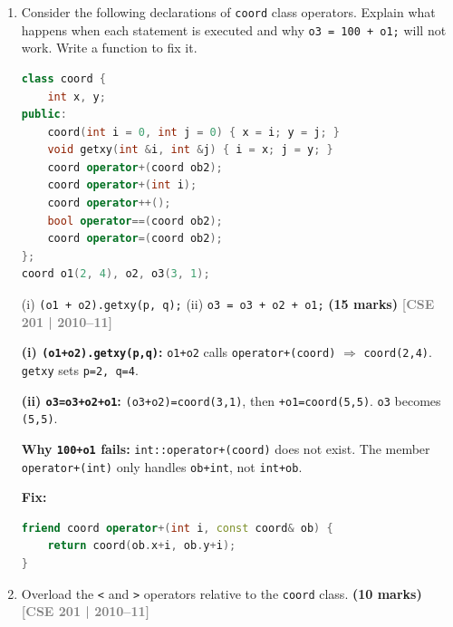 \documentclass[12pt,a3paper]{article}
\newcommand{\yr}[1]{\hfill\textcolor{gray}{\small\textbf{[#1]}}}
\newcommand{\mk}[1]{\textcolor{orange!70!black}{\small\textbf{(#1 marks)}}}
\begin{document}
\begin{enumerate}
\begin{tcolorbox}
\end{tcolorbox}

\item Consider the following declarations of \texttt{coord} class operators. Explain what happens when each statement is executed and why \texttt{o3 = 100 + o1;} will not work. Write a function to fix it.
\begin{lstlisting}[language=C++]
class coord {
    int x, y;
public:
    coord(int i = 0, int j = 0) { x = i; y = j; }
    void getxy(int &i, int &j) { i = x; j = y; }
    coord operator+(coord ob2);
    coord operator+(int i);
    coord operator++();
    bool operator==(coord ob2);
    coord operator=(coord ob2);
};
coord o1(2, 4), o2, o3(3, 1);
\end{lstlisting}
(i) \texttt{(o1 + o2).getxy(p, q);} \quad (ii) \texttt{o3 = o3 + o2 + o1;}
\mk{15}
\yr{CSE 201 | 2010--11}


\begin{tcolorbox}[enhanced,breakable,ansbox,colback=cF!4,colframe=cF,
  boxrule=0.8pt,arc=5pt,
  title={\textbf{Answer --- coord operator statements analysis; fix 100+o1}},
  fonttitle=\bfseries\color{white},colbacktitle=cF]

\textbf{(i) \texttt{(o1+o2).getxy(p,q)}:}
\texttt{o1+o2} calls \texttt{operator+(coord)} $\Rightarrow$
\texttt{coord(2,4)}.  \texttt{getxy} sets \texttt{p=2, q=4}.

\textbf{(ii) \texttt{o3=o3+o2+o1}:}
\texttt{(o3+o2)=coord(3,1)}, then \texttt{+o1=coord(5,5)}.
\texttt{o3} becomes \texttt{(5,5)}.

\textbf{Why \texttt{100+o1} fails:}
\texttt{int::operator+(coord)} does not exist.  The member
\texttt{operator+(int)} only handles \texttt{ob+int}, not
\texttt{int+ob}.

\textbf{Fix:}
\begin{lstlisting}[language=C++]
friend coord operator+(int i, const coord& ob) {
    return coord(ob.x+i, ob.y+i);
}
\end{lstlisting}

\end{tcolorbox}

\item Overload the \texttt{<} and \texttt{>} operators relative to the \texttt{coord} class. \mk{10}
\yr{CSE 201 | 2010--11}


\begin{tcolorbox}[enhanced,breakable,ansbox,colback=cF!4,colframe=cF,
  boxrule=0.8pt,arc=5pt,
  title={\textbf{Answer --- Overload < and > for coord}},
  fonttitle=\bfseries\color{white},colbacktitle=cF]


\end{tcolorbox}
\end{enumerate}
\end{document}
